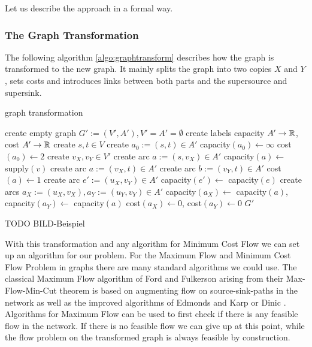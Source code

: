 Let us describe the approach in a formal way.

\subsubsection*{The Graph Transformation}

The following algorithm \ref{algo:graphtransform} describes how the graph is transformed to the new graph. It mainly 
splits the graph into two copies $X$ and $Y$, sets costs and introduces links between both parts and the 
supersource and supersink.

\begin{algorithm}
 \caption{graph transformation}
 \label{algo:graphtransform}
 \begin{algorithmic}[5]
  \State create empty graph $G':=(V',A'), V'=A'=\emptyset$
  \State create labels capacity $A'\to \mathbb{R}$, cost $A'\to \mathbb{R}$%
  \State create $s, t\in V$ 
  \State create $a_0 :=(s,t) \in A'$
  \State capacity$(a_0)\gets\infty$ 
  \State cost$(a_0)\gets 2$ 
    \State create $v_X, v_Y\in V'$
      \State create arc $a:=(s,v_X)\in A'$
      \State capacity$(a)\gets$ supply$(v)$
      \State create arc $a:=(v_X, t)\in A'$
      \State create arc $b:=(v_Y,t)\in A'$
      \State cost$(a)\gets 1$
    \EndIf
  \EndFor
      \State create arc $e':=(u_X, v_Y)\in A'$
      \State capacity$(e')\gets$ capacity$(e)$
    \Else
      \State create arcs $a_X:=(u_X, v_X), a_Y:=(u_Y, v_Y)\in A'$
      \State capacity$(a_X)\gets$ capacity$(a)$, capacity$(a_Y)\gets$ capacity$(a)$
      \State cost$(a_X)\gets 0$, cost$(a_Y)\gets0$
    \EndIf
  \EndFor
  \State \Return $G'$
  \EndFunction
 \end{algorithmic}

\end{algorithm}

TODO BILD-Beispiel 

With this transformation and any algorithm for Minimum Cost Flow we can set up an algorithm for our problem. 
For the Maximum Flow and Minimum Cost Flow Problem in graphs there are many standard algorithms we could use. The 
classical Maximum Flow algorithm of Ford and Fulkerson \cite{Ford-Fulkerson_algo} arising from their Max-Flow-Min-Cut 
theorem is based on augmenting flow on source-sink-paths in the network as well as the improved algorithms of Edmonds 
and Karp \cite{EdmondsKarp1972} or Dinic \cite{Dinic1970}. Algorithms for Maximum Flow can be used to first check if 
there is any feasible flow in the network. If there is no feasible flow we can give up at this point, while the flow 
problem on the transformed graph is always feasible by construction.

